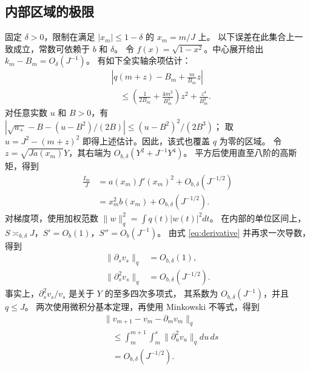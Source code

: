 \documentclass[aps,pra,reprint,superscriptaddress,longbibliography]{revtex4-2}
\theoremstyle{remark}
\newcommand{\norm}[1]{\lVert#1\rVert}
\begin{document}
\subsection{内部区域的极限}

固定 $\delta>0$，限制在满足 $|x_m|\leq1-\delta$ 的 $x_m=m/J$ 上。
以下误差在此集合上一致成立，常数可依赖于 $b$ 和 $\delta$。
令 $f(x)=\sqrt{1-x^2}$。中心展开给出 $k_m-B_m=O_\delta(J^{-1})$。
有如下全实轴余项估计：
\begin{equation}
\begin{aligned}
&\left|q(m+z)-B_m+\frac{m}{B_m}z\right|\\
&\quad\leq\left(\frac1{2B_m}+\frac{4m^2}{B_m^3}\right)z^2
             +\frac{z^4}{B_m^3}.
\end{aligned}
\label{eq:q-taylor}
\end{equation}
对任意实数 $u$ 和 $B>0$，有
$|\sqrt{u_+}-B-(u-B^2)/(2B)|\leq(u-B^2)^2/(2B^3)$；
取 $u=J^2-(m+z)^2$ 即得上述估计。因此，该式也覆盖 $q$ 为零的区域。
令 $z=\sqrt{Ja(x_m)}Y$，其右端为 $O_{b,\delta}(Y^2+J^{-1}Y^4)$。
平方后使用直至八阶的高斯矩，得到
\begin{equation}
\begin{aligned}
\frac{I_m}{J}
 &=a(x_m)f'(x_m)^2+O_{b,\delta}(J^{-1/2})\\
 &=x_m^2b(x_m)+O_{b,\delta}(J^{-1/2}).
\end{aligned}
\label{eq:I-limit}
\end{equation}
对梯度项，使用加权范数 $\norm w_q^2=\int q(t)|w(t)|^2dt$。
在内部的单位区间上，$S\asymp_{b,\delta}J$，$S'=O_b(1)$，$S''=O_b(J^{-1})$。
由式 \eqref{eq:derivative} 并再求一次导数，得到
\begin{equation}
\begin{aligned}
\norm{\partial_sv_s}_q&=O_{b,\delta}(1),\\
\norm{\partial_s^2v_s}_q&=O_{b,\delta}(J^{-1/2}).
\end{aligned}
\label{eq:H2}
\end{equation}
事实上，$\partial_s^2v_s/v_s$ 是关于 $Y$ 的至多四次多项式，
其系数为 $O_{b,\delta}(J^{-1})$，并且 $q\leq J$。
两次使用微积分基本定理，再使用 Minkowski 不等式，得到
\begin{equation}
\begin{aligned}
&\norm{v_{m+1}-v_m-\partial_mv_m}_q\\
&\quad\leq\int_m^{m+1}\int_m^s
\norm{\partial_u^2v_u}_qdu\,ds\\
&\quad=O_{b,\delta}(J^{-1/2}).
\end{aligned}
\label{eq:finite-diff}
\end{equation}
\end{document}
